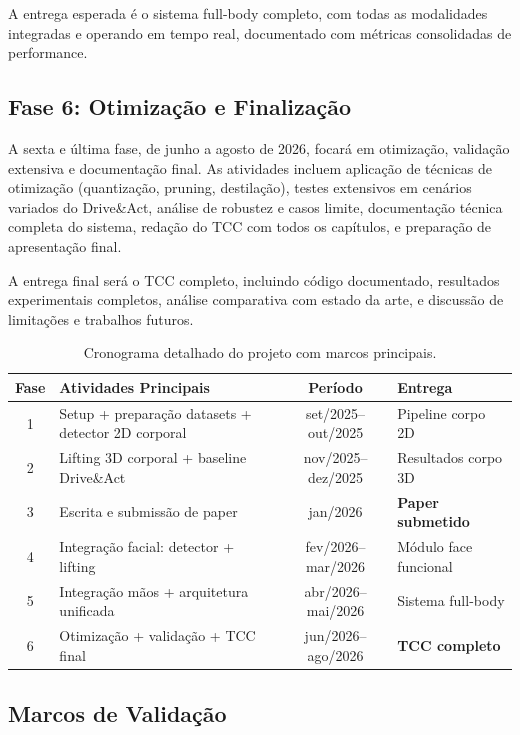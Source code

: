 \documentclass[12pt, a4paper]{article}
\begin{document}
A entrega esperada é o sistema full-body completo, com todas as modalidades integradas e operando em tempo real, documentado com métricas consolidadas de performance.

\subsection{Fase 6: Otimização e Finalização}

A sexta e última fase, de junho a agosto de 2026, focará em otimização, validação extensiva e documentação final. As atividades incluem aplicação de técnicas de otimização (quantização, pruning, destilação), testes extensivos em cenários variados do Drive\&Act, análise de robustez e casos limite, documentação técnica completa do sistema, redação do TCC com todos os capítulos, e preparação de apresentação final.

A entrega final será o TCC completo, incluindo código documentado, resultados experimentais completos, análise comparativa com estado da arte, e discussão de limitações e trabalhos futuros.

\begin{table}[!ht]
    \centering
    \caption{Cronograma detalhado do projeto com marcos principais.}
    \label{tab:cronograma}
    \begin{tabular}{|c|p{6cm}|c|p{2.8cm}|}
        \hline
        \textbf{Fase} & \textbf{Atividades Principais} & \textbf{Período} & \textbf{Entrega} \\ \hline
        1 & Setup + preparação datasets + detector 2D corporal & set/2025--out/2025 & Pipeline corpo 2D \\ \hline
        2 & Lifting 3D corporal + baseline Drive\&Act & nov/2025--dez/2025 & Resultados corpo 3D \\ \hline
        3 & Escrita e submissão de paper & jan/2026 & \textbf{Paper submetido} \\ \hline
        4 & Integração facial: detector + lifting & fev/2026--mar/2026 & Módulo face funcional \\ \hline
        5 & Integração mãos + arquitetura unificada & abr/2026--mai/2026 & Sistema full-body \\ \hline
        6 & Otimização + validação + TCC final & jun/2026--ago/2026 & \textbf{TCC completo} \\ \hline
    \end{tabular}
\end{table}

\subsection{Marcos de Validação}
\end{document}
